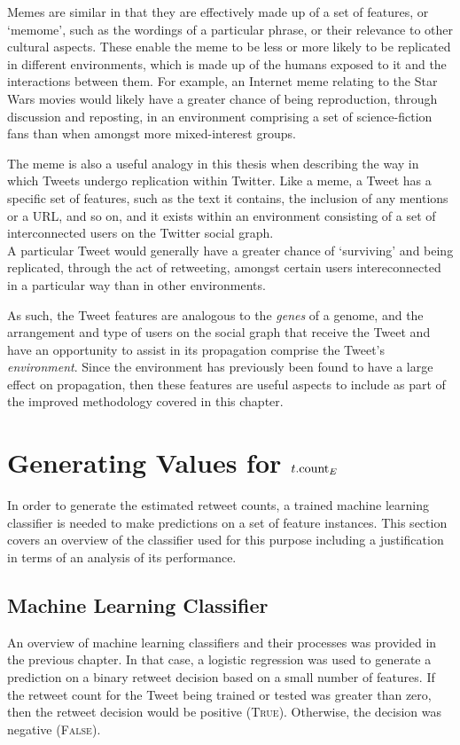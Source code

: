 Memes are similar in that they are effectively made up of a set of features, or `memome', such as the wordings of a particular phrase, or their relevance to other cultural aspects. These enable the meme to be less or more likely to be replicated in different environments, which is made up of the humans exposed to it and the interactions between them. For example, an Internet meme relating to the Star Wars movies would likely have a greater chance of being reproduction, through discussion and reposting, in an environment comprising a set of science-fiction fans than when amongst more mixed-interest groups.

The meme is also a useful analogy in this thesis when describing the way in which Tweets undergo replication within Twitter. Like a meme, a Tweet has a specific set of features, such as the text it contains, the inclusion of any mentions or a URL, and so on, and it exists within an environment consisting of a set of interconnected users on the Twitter social graph.\\
A particular Tweet would generally have a greater chance of `surviving' and being replicated, through the act of retweeting, amongst certain users intereconnected in a particular way than in other environments.

As such, the Tweet features are analogous to the \textit{genes} of a genome, and the arrangement and type of users on the social graph that receive the Tweet and have an opportunity to assist in its propagation comprise the Tweet's \textit{environment}. Since the environment has previously been found to have a large effect on propagation, then these features are useful aspects to include as part of the improved methodology covered in this chapter.


\section{Generating Values for $t.\textrm{count}_E$}
In order to generate the estimated retweet counts, a trained machine learning classifier is needed to make predictions on a set of feature instances. This section covers an overview of the classifier used for this purpose including a justification in terms of an analysis of its performance.


\subsection{Machine Learning Classifier}
An overview of machine learning classifiers and their processes was provided in the previous chapter. In that case, a logistic regression was used to generate a prediction on a binary retweet decision based on a small number of features. If the retweet count for the Tweet being trained or tested was greater than zero, then the retweet decision would be positive (\textsc{True}). Otherwise, the decision was negative (\textsc{False}).

